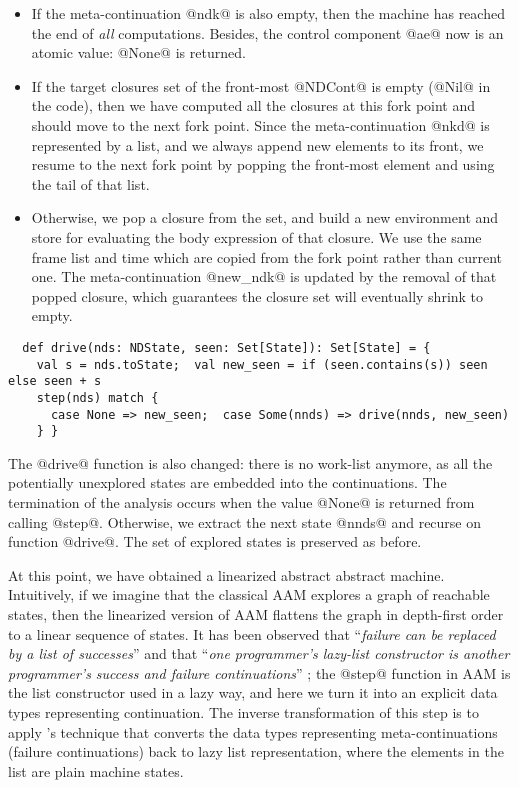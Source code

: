 \documentclass[acmsmall, screen]{acmart}\settopmatter{}
\begin{document}
\begin{itemize}
  \item If the meta-continuation @ndk@ is also empty, then the machine has reached the end of \textit{all}
    computations. Besides, the control component @ae@ now is an atomic value: @None@ is returned.
  \item If the target closures set of the front-most @NDCont@ is empty (@Nil@ in the code),
    then we have computed all the closures at this fork point and should move to the next fork
    point. Since the meta-continuation @nkd@ is represented by a list, and we always append new
    elements to its front, we resume to the next fork point by popping the front-most
    element and using the tail of that list.
  \item Otherwise, we pop a closure from the set, and build a new environment and store for
    evaluating the body expression of that closure. We use the same frame list and time which
    are copied from the fork point rather than current one.
    The meta-continuation @new_ndk@ is updated by the removal of that popped closure, which guarantees
    the closure set will eventually shrink to empty.
\end{itemize}

\begin{lstlisting}
  def drive(nds: NDState, seen: Set[State]): Set[State] = {
    val s = nds.toState;  val new_seen = if (seen.contains(s)) seen else seen + s
    step(nds) match {
      case None => new_seen;  case Some(nnds) => drive(nnds, new_seen)
    } }
\end{lstlisting}

The @drive@ function is also changed: there is no work-list anymore, as all the potentially
unexplored states are embedded into the continuations.
The termination of the analysis occurs when the value @None@ is returned from calling @step@.
Otherwise, we extract the next state @nnds@ and recurse on function @drive@.
The set of explored states is preserved as before.

At this point, we have obtained a linearized abstract abstract machine.
Intuitively, if we imagine that the classical AAM explores a graph of reachable states,
then the linearized version of AAM flattens the graph in depth-first order to a linear sequence of states.
It has been observed that ``\textit{failure can be replaced by a list of successes}''
\cite{10.1007/3-540-15975-4_33} and that ``\textit{one programmer’s lazy-list
constructor is another programmer’s success and failure continuations}'' \cite{danvy2006a};
the @step@ function in AAM is the list constructor used in a lazy way, and here we turn it
into an explicit data types representing continuation.
The inverse transformation of this step is to apply \citeauthor{10.1007/3-540-15975-4_33}'s
technique that converts the data types representing meta-continuations (failure continuations)
back to lazy list representation, where the elements in the list are plain machine states.
\end{document}
